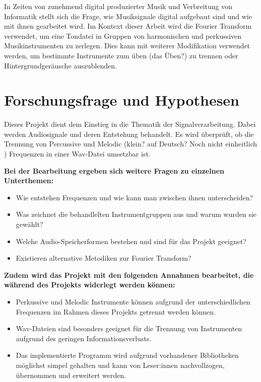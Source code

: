 \par

In Zeiten von zunehmend digital produzierter Musik und Verbreitung von Informatik stellt sich die Frage, wie Musiksignale digital aufgebaut sind und wie mit ihnen gearbeitet wird. Im Kontext dieser Arbeit wird die Fourier Transform verwendet, um eine Tondatei in Gruppen von harmonischen und perkussiven Musikinstrumenten zu zerlegen. Dies kann mit weiterer Modifikation verwendet werden, um bestimmte Instrumente zum üben (das Üben?) zu trennen oder Hintergrundgeräusche auszublenden.


%
\section{Forschungsfrage und Hypothesen}
%

Dieses Projekt dient dem Einstieg in die Thematik der Signalverarbeitung. Dabei werden Audiosignale und deren Entstehung behandelt.
Es wird überprüft, ob die Trennung von Percussive und Melodic (klein? auf Deutsch? Noch nicht einheitlich ) Frequenzen in einer Wav-Datei umsetzbar ist.

\par

\textbf{Bei der Bearbeitung ergeben sich weitere Fragen zu einzelnen Unterthemen:}

%
\begin{itemize}
    \item Wie entstehen Frequenzen und wie kann man zwischen ihnen unterscheiden?
    \item Was zeichnet die behandlelten Instrumentgruppen aus und warum wurden sie gewählt?
    \item Welche Audio-Speicherformen bestehen und sind für das Projekt geeignet?
    \item Existieren alternative Metodiken zur Fourier Transform? 
\end{itemize}
%

\textbf{Zudem wird das Projekt mit den folgenden Annahmen bearbeitet, die während des Projekts widerlegt werden können:}

%
\begin{itemize}
    \item Perkussive und Melodic Instrumente können aufgrund der unterschiedlichen Frequenzen im Rahmen dieses Projekts getrennt werden können.
    \item Wav-Dateien sind besonders geeignet für die Trennung von Instrumenten aufgrund des geringen Informationsverlusts.
    \item Das implementierte Programm wird aufgrund vorhandener Bibliotheken möglichst simpel gehalten und kann von Leser:innen nachvollzogen, übernommen und erweitert werden.
\end{itemize}
%

